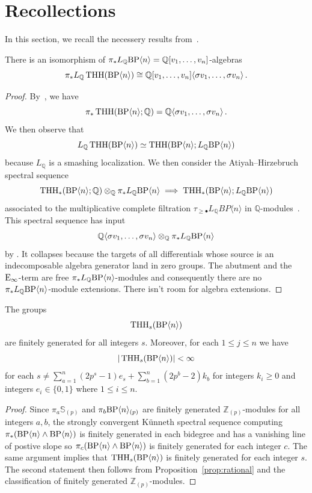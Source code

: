 \section{Recollections}
In this section, we recall the necessery results from~\cite{AKCH24}. 

\begin{proposition}\label{prop:rational}
There is an isomorphism of $\pi_{*}L_{\mathbb{Q}}\mathrm{BP}\langle n\rangle=\mathbb{Q}[v_{1},\dots ,v_{n}]$-algebras
\[ 
\pi_{*}L_{\mathbb{Q}}\operatorname{THH}(\mathrm{BP}\langle n\rangle )\cong\mathbb{Q}[v_1,\dots ,v_n]\langle \sigma v_1,\dots ,\sigma v_n\rangle \,.
\]
\end{proposition}
\begin{proof}
By~\cite[Proposition~3.7]{AKCH24}, we have
\[ 
    \pi_{*}\operatorname{THH}(\mathrm{BP}\langle n\rangle;\mathbb{Q} )=\mathbb{Q}\langle \sigma v_1,\dots ,\sigma v_n\rangle\,.
\]
We then observe that 
\[L_{\mathbb{Q}}\operatorname{THH}(\mathrm{BP}\langle n\rangle )\simeq \operatorname{THH}(\mathrm{BP}\langle n\rangle;L_{\mathbb{Q}}\mathrm{BP}\langle n\rangle )\]
because $L_{\mathbb{Q}}$ is a smashing localization. 
We then consider the Atiyah--Hirzebruch spectral sequence 
\[
\operatorname{THH}_{*}(\mathrm{BP}\langle n\rangle;\mathbb{Q})\otimes_{\mathbb{Q}} \pi_{*}L_{\mathbb{Q}}\mathrm{BP}\langle n\rangle\implies \operatorname{THH}_{*}(\mathrm{BP}\langle n\rangle;L_{\mathbb{Q}}\mathrm{BP}\langle n\rangle)
\]
associated to the multiplicative complete filtration $\tau_{\ge \bullet}L_{\mathbb{Q}}BP\langle n\rangle$ in $\mathbb{Q}$-modules~\cite[\S~3.2]{Hon20}. 
This spectral sequence has input 
\[ \mathbb{Q} \langle \sigma v_{1},\dots ,\sigma v_{n}\rangle \otimes_{\mathbb{Q}}\pi_{*}L_{\mathbb{Q}}\mathrm{BP}\langle n\rangle 
\]
by \cite[Proposition~3.7]{AKCH24}. It collapses because the targets of all differentials whose source is an indecomposable algebra generator land in zero groups. The abutment and the $\mathrm{E}_{\infty}$-term are free $\pi_{*}L_{\mathbb{Q}}\mathrm{BP}\langle n\rangle$-modules and consequently there are no $\pi_*L_{\mathbb{Q}}\mathrm{BP}\langle n\rangle$-module extensions. 
There isn't room for algebra extensions. 
\end{proof}

\begin{proposition}
The groups 
\[ 
\operatorname{THH}_{s}(\mathrm{BP}\langle n\rangle )
\]
are finitely generated for all integers $s$. Moreover, for each $1\le j\le n$ we have 
\[
|\operatorname{THH}_{s}(\mathrm{BP}\langle n\rangle )|<\infty
\]
for each $s\ne \sum_{a=1}^n(2p^s-1)e_s+\sum_{b=1}^n(2p^b-2)k_b$ for integers $k_i\ge 0$ and integers $e_i\in \{0,1\}$ where $1\le i\le n$. 
\end{proposition}
\begin{proof}
Since $\pi_{a}\mathbb{S}_{(p)}$ and $\pi_{b}\mathrm{BP}\langle n\rangle_{(p)}$ are finitely generated $\mathbb{Z}_{(p)}$-modules for all integers $a,b$, the strongly convergent K\"unneth spectral sequence computing $\pi_{*}(\mathrm{BP}\langle n\rangle\wedge \mathrm{BP}\langle n\rangle)$ is finitely generated in each bidegree and has a vanishing line of postive slope so $\pi_{c}(\mathrm{BP}\langle n\rangle\wedge \mathrm{BP}\langle n\rangle)$ is finitely generated for each integer $c$. The same argument implies that $\operatorname{THH}_{s}(\mathrm{BP}\langle n\rangle)$ is finitely generated for each integer $s$. The second statement then follows from Proposition~\ref{prop:rational} and the classification of finitely generated $\mathbb{Z}_{(p)}$-modules. 
\end{proof}